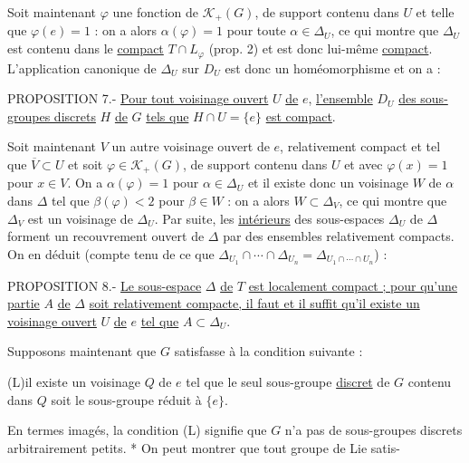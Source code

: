 Soit maintenant $\varphi$ une fonction de $\mathcal K_+(G)$, de support contenu dans $U$ et telle que $\varphi(e)=1$ : on a alors $\alpha(\varphi)=1$ pour toute $\alpha\in\Delta_U$, ce qui montre que $\Delta_U$ est contenu dans le \uline{compact} $T\cap L_\varphi$ (prop. 2) et est donc lui-même \uline{compact}. L'application canonique de $\Delta_U$ sur $D_U$ est donc un homéomorphisme et on a :

PROPOSITION 7.- \uline{Pour tout voisinage ouvert} $U$ \uline{de} $e$, \uline{l'ensemble} $D_U$ \uline{des sous-groupes discrets} $H$ \uline{de} $G$ \uline{tels que} $H\cap U=\{e\}$ \uline{est compact}.

Soit maintenant $V$ un autre voisinage ouvert de $e$, relativement compact et tel que $\overline V\subset U$ et soit $\varphi\in\mathcal K_+(G)$, de support contenu dans $U$ et avec $\varphi(x)=1$ pour $x\in V$. On a $\alpha(\varphi)=1$ pour $\alpha\in\Delta_U$ et il existe donc un voisinage $W$ de $\alpha$ dans $\Delta$ tel que $\beta(\varphi)<2$ pour $\beta\in W$ : on a alors $W\subset\Delta_V$, ce qui montre que $\Delta_V$ est un voisinage de $\Delta_U$. Par suite, les \uline{intérieurs} des sous-espaces $\Delta_U$ de $\Delta$ forment un recouvrement ouvert de $\Delta$ par des ensembles relativement compacts. On en déduit (compte tenu de ce que $\Delta_{U_1}\cap\cdots\cap\Delta_{U_n}=\Delta_{U_1\cap\cdots\cap U_n}$) :

PROPOSITION 8.- \uline{Le sous-espace} $\Delta$ \uline{de} $T$ \uline{est localement compact ; pour qu'une partie} $A$ \uline{de} $\Delta$ \uline{soit relativement compacte, il faut et il suffit qu'il existe un voisinage ouvert} $U$ \uline{de} $e$ \uline{tel que} $A\subset\Delta_U$.

Supposons maintenant que $G$ satisfasse à la condition suivante :

(L)\qquad il existe un voisinage $Q$ de $e$ tel que le seul sous-groupe \uline{discret} de $G$ contenu dans $Q$ soit le sous-groupe réduit à $\{e\}$.

En termes imagés, la condition (L) signifie que $G$ n'a pas de sous-groupes discrets arbitrairement petits. * On peut montrer que tout groupe de Lie satis-


